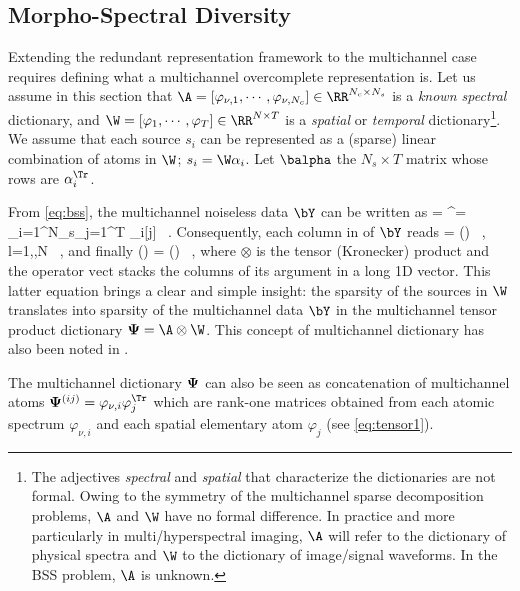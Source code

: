 
\subsection{Morpho-Spectral Diversity}
Extending the redundant representation framework to the multichannel case requires defining what a multichannel overcomplete representation is.
Let us assume in this section that $\A = [\varphi_{\nu,1}, \cdots, \varphi_{\nu, N_c}] \in \RR^{N_c \times N_s}$ is a \textit{known spectral} dictionary, and $\W = [ \varphi_{1}, \cdots, \varphi_{T}] \in \RR^{N \times T}$ is a \textit{spatial} or \textit{temporal} dictionary\footnote{The adjectives \textit{spectral} and \textit{spatial} that characterize the dictionaries are not formal. Owing to the symmetry of the multichannel sparse decomposition problems, $\A$ and $\W$ have no formal difference. In practice and more particularly in multi/hyperspectral imaging, $\A$ will refer to the dictionary of physical spectra and $\W$ to the dictionary of image/signal waveforms. In the BSS problem, $\A$ is unknown.}. We assume that each source $s_i$ can be  represented as a (sparse) linear combination of atoms in $\W$; $s_i=\W\alpha_i$. Let $\balpha$ the $N_s \times T$ matrix whose rows are $\alpha_i^\Tr$.

From \eqref{eq:bss}, the multichannel noiseless data $\bY$ can be written as
\be
\label{eq:tensor1}
\bY = \A\balpha\W^\Tr = \sum_{i=1}^{N_s}\sum_{j=1}^{T} \alpha_i[j] ~.
\ee
Consequently, each column in of $\bY$ reads
\be
\label{eq:tensor2}
\bY[.,l] = \parenth{\A \otimes \W[l,.]} (\balpha) ~, \quad \forall ~ l=1,\cdots,N ~,
\ee
and finally
\be
\label{eq:tensor3}
(\bY) = \parenth{\A \otimes \W} (\balpha) ~,
\ee
where $\otimes$ is the tensor (Kronecker) product and the operator $\mathrm{vect}$ stacks the columns of its argument in a long 1D vector. This latter equation brings a clear and simple insight: the sparsity of the sources in $\W$ translates into sparsity of the multichannel data $\bY$ in the multichannel tensor product dictionary ${\bf \Psi}=\A \otimes \W$. This concept of multichannel dictionary has also been noted in \citet{GN05}.

The multichannel dictionary $\bf \Psi$ can also be seen as concatenation of multichannel atoms ${\bf \Psi}^{(ij)}=\varphi_{\nu,i}\varphi_{j}^\Tr$ which are rank-one matrices obtained from each atomic spectrum $\varphi_{\nu,i}$ and each spatial elementary atom $\varphi_{j}$ (see \eqref{eq:tensor1}). 

